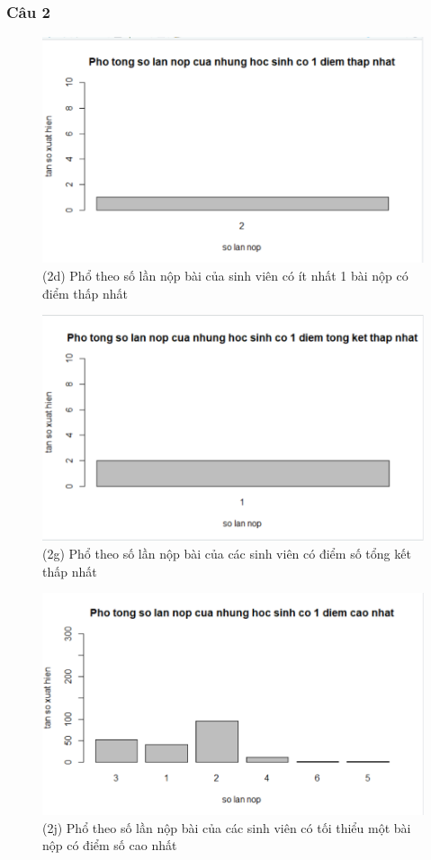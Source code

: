\documentclass[a4paper]{article}
\theoremstyle{definition}
\begin{document}
\subsubsection{Câu 2}
\begin{figure}[!ht]
    \centering
    \includegraphics[scale=0.4]{Pics/q2d-file3.PNG}
    \caption{(2d) Phổ theo số lần nộp bài của sinh viên có ít nhất 1 bài nộp có điểm thấp nhất}
    \label{fig:my_label}
\end{figure}
\begin{figure}[!ht]
    \centering
    \includegraphics[scale=0.4]{Pics/q2g-file3.PNG}
    \caption{(2g) Phổ theo số lần nộp bài của các sinh viên có điểm số tổng kết thấp nhất }
    \label{fig:my_label}
\end{figure}
\newpage
\begin{figure}[!ht]
    \centering
    \includegraphics[scale=0.4]{Pics/q2j-file3.PNG}
    \caption{(2j)  Phổ theo số lần nộp bài của các sinh viên có tối thiểu một bài nộp có điểm số cao nhất}
    \label{fig:my_label}
\end{figure}
\end{document}
